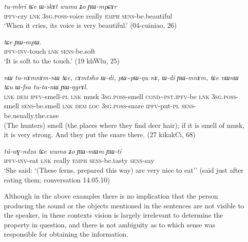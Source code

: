 \documentclass[oldfontcommands,oneside,a4paper,11pt]{article}
\newcommand{\ipa}[1]{{\phon\textit{#1}}} %
\newcommand{\rdp}{\textasciitilde{}}
\begin{document}
\begin{exe}
\ex \label{ex:tumbri}
\gll
\ipa{tu-mbri} 	\ipa{tɕe} 	\ipa{ɯ-skɤt} 	\ipa{wuma} 	\ipa{ʑo} 	\ipa{ɲɯ-mpɕɤr} \\
\textsc{ipfv}-cry \textsc{lnk} \textsc{3sg.poss}-voice really \textsc{emph} \textsc{sens}-be.beautiful \\
\glt `When it cries, its voice is very beautiful.' (04-cuiniao, 26)
\end{exe}
\begin{exe}
\ex \label{ex:YWmpW}
\gll \ipa{ɲɯ́-wɣ-nɤmɤle} 	\ipa{tɕe} 	\ipa{ɲɯ-mpɯ.} \\
\textsc{ipfv-inv}-touch \textsc{lnk} \textsc{sens}-be.soft \\
\glt `It is soft to the touch.' (19 khWlu, 25)
\end{exe}

\begin{exe}
\ex \label{ex:tunAmnAmnW}
\gll \ipa{tɕe} 	\ipa{nɯ} 	\ipa{tu-nɤmnɤm-nɯ} 	\ipa{tɕe,} 	\ipa{cɤmtsho} 	\ipa{ɯ-di,} 	\ipa{pɯ\rdp{}pɯ-ŋu} 	\ipa{nɤ,} 	\ipa{ɯ-di} 	\ipa{ɲɯ-mnɤm,} \ipa{tɕe} 	\ipa{nɯnɯ} 	\ipa{tɕu} 	\ipa{ɯ-fsa} 	\ipa{tu-ta-nɯ} 	\ipa{ɲɯ-ŋgrɤl.} \\
\textsc{lnk} \textsc{dem} \textsc{ipfv}-smell-\textsc{pl} \textsc{lnk} musk \textsc{3sg.poss}-smell \textsc{cond\rdp{}pst.ipfv}-be \textsc{lnk} \textsc{3sg.poss}-smell \textsc{sens}-be.smell \textsc{lnk} \textsc{dem} \textsc{loc} \textsc{3sg.poss}-snare \textsc{ipfv}-put-\textsc{pl} \textsc{sens}-be.usually.the.case \\
\glt (The hunters) smell (the places where they find deer hair); if it is smell of musk, it is very strong. And they put the snare there. (27 kikakCi, 68)
\end{exe}

\begin{exe}
\ex \label{ex:YWmWm}
\gll
\ipa{tú-wɣ-ndza} 	\ipa{tɕe} 	\ipa{wuma} 	\ipa{ʑo} 	\ipa{ɲɯ-mɯm} 	\ipa{ɲɯ-ti} \\
\textsc{ipfv-inv}-eat \textsc{lnk} really \textsc{emph} \textsc{sens}-be.tasty \textsc{sens}-say \\
\glt `She said: `(These ferns, prepared this way) are very nice to eat'' (said just after eating them; conversation 14.05.10)
\end{exe}

Although in the above examples there is no implication that the person producing the sound or the objects mentioned in the sentences are not visible to the speaker, in these contexts vision is largely irrelevant to determine the property in question, and there is not ambiguity as to which sense was responsible for obtaining the information.  
\end{document}
